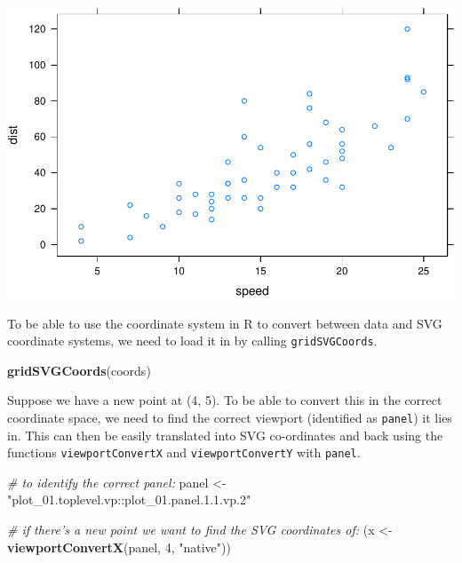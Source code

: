 \documentclass[11pt,]{report}
\newenvironment{Shaded}{\begin{snugshade}}{\end{snugshade}}
\newcommand{\KeywordTok}[1]{\textcolor[rgb]{0.13,0.29,0.53}{\textbf{#1}}}
\newcommand{\DataTypeTok}[1]{\textcolor[rgb]{0.13,0.29,0.53}{#1}}
\newcommand{\DecValTok}[1]{\textcolor[rgb]{0.00,0.00,0.81}{#1}}
\newcommand{\StringTok}[1]{\textcolor[rgb]{0.31,0.60,0.02}{#1}}
\newcommand{\CommentTok}[1]{\textcolor[rgb]{0.56,0.35,0.01}{\textit{#1}}}
\newcommand{\OtherTok}[1]{\textcolor[rgb]{0.56,0.35,0.01}{#1}}
\newcommand{\OperatorTok}[1]{\textcolor[rgb]{0.81,0.36,0.00}{\textbf{#1}}}
\newcommand{\NormalTok}[1]{#1}
\begin{document}
\begin{center}\includegraphics{figures/unnamed-chunk-31-1} \end{center}

\begin{Shaded}
\end{Shaded}

To be able to use the coordinate system in R to convert between data and
SVG coordinate systems, we need to load it in by calling
\texttt{gridSVGCoords}.

\begin{Shaded}
\begin{Highlighting}[]
\KeywordTok{gridSVGCoords}\NormalTok{(coords)}
\end{Highlighting}
\end{Shaded}

Suppose we have a new point at (4, 5). To be able to convert this in the
correct coordinate space, we need to find the correct viewport
(identified as \texttt{panel}) it lies in. This can then be easily
translated into SVG co-ordinates and back using the functions
\texttt{viewportConvertX} and \texttt{viewportConvertY} with
\texttt{panel}.

\begin{Shaded}
\begin{Highlighting}[]
\CommentTok{# to identify the correct panel:}
\NormalTok{panel <-}\StringTok{ "plot_01.toplevel.vp::plot_01.panel.1.1.vp.2"}

\CommentTok{# if there's a new point we want to find the SVG coordinates of:}
\NormalTok{(x <-}\StringTok{ }\KeywordTok{viewportConvertX}\NormalTok{(panel, }\DecValTok{4}\NormalTok{, }\StringTok{"native"}\NormalTok{))}
\end{Highlighting}
\end{Shaded}
\end{document}

